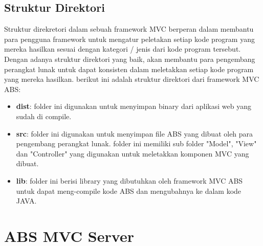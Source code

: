 \subsection{Struktur Direktori}
Struktur direkretori dalam sebuah framework MVC berperan dalam membantu para pengguna framework untuk mengatur peletakan setiap kode program yang mereka hasilkan sesuai dengan kategori / jenis dari kode program tersebut. Dengan adanya struktur direktori yang baik, akan membantu para pengembang perangkat lunak untuk dapat konsisten dalam meletakkan setiap kode program yang mereka hasilkan. berikut ini adalah struktur direktori dari framework MVC ABS:

\begin{itemize}
    \item \textbf{dist}: folder ini digunakan untuk menyimpan binary dari aplikasi web yang sudah di compile.
    \item \textbf{src}: folder ini digunakan untuk menyimpan file ABS yang dibuat oleh para pengembang perangkat lunak. folder ini memiliki sub folder "Model", "View" dan "Controller" yang digunakan untuk meletakkan komponen MVC yang dibuat.
    \item \textbf{lib}: folder ini berisi library yang dibutuhkan oleh framework MVC ABS untuk dapat meng-compile kode ABS dan mengubahnya ke dalam kode JAVA.
\end{itemize}

\section{ABS MVC Server}
